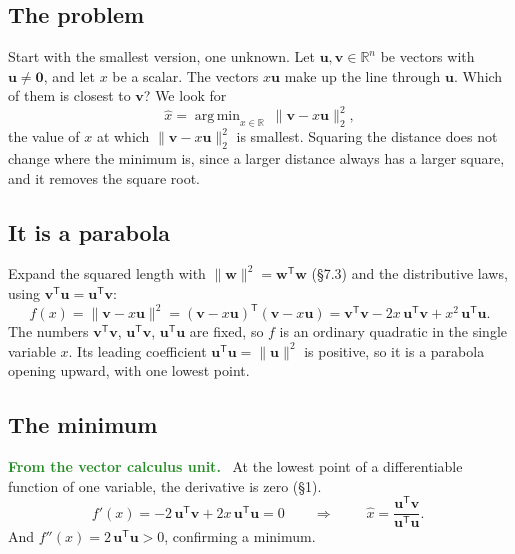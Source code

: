 \documentclass[11pt]{article}
\theoremstyle{plain}
\theoremstyle{definition}
\theoremstyle{remark}
\newcommand{\lookback}[1][the vector unit]{\par\smallskip\noindent
  \textbf{\sffamily\textcolor{ForestGreen}{From #1.}}\ \ignorespaces}
\newcommand{\R}{\mathbb{R}}
\newcommand{\vc}[1]{\mathbf{#1}}
\newcommand{\norm}[1]{\lVert #1\rVert}
\newcommand{\T}{^{\mathsf{T}}}
\DeclareMathOperator*{\argmin}{arg\,min}
\begin{document}
\subsection{The problem}
Start with the smallest version, one unknown. Let $\vc{u},\vc{v}\in\R^{n}$ be
vectors with $\vc{u}\neq\vc{0}$, and let $x$ be a scalar. The vectors $x\vc{u}$
make up the line through $\vc{u}$. Which of them is closest to $\vc{v}$? We look
for
\[
  \hat x=\argmin_{x\in\R}\ \norm{\vc{v}-x\vc{u}}_2^{2},
\]
the value of $x$ at which $\norm{\vc{v}-x\vc{u}}_2^{2}$ is smallest. Squaring
the distance does not change where the minimum is, since a larger distance always
has a larger square, and it removes the square root.

\subsection{It is a parabola}
Expand the squared length with $\norm{\vc{w}}^{2}=\vc{w}\T\vc{w}$ (\S7.3) and the
distributive laws, using $\vc{v}\T\vc{u}=\vc{u}\T\vc{v}$:
\[
  f(x)=\norm{\vc{v}-x\vc{u}}^{2}
  =(\vc{v}-x\vc{u})\T(\vc{v}-x\vc{u})
  =\vc{v}\T\vc{v}-2x\,\vc{u}\T\vc{v}+x^{2}\,\vc{u}\T\vc{u}.
\]
The numbers $\vc{v}\T\vc{v}$, $\vc{u}\T\vc{v}$, $\vc{u}\T\vc{u}$ are fixed, so $f$ is
an ordinary quadratic in the single variable $x$. Its leading coefficient
$\vc{u}\T\vc{u}=\norm{\vc{u}}^{2}$ is positive, so it is a parabola opening upward,
with one lowest point.

\subsection{The minimum}
\lookback[the vector calculus unit] At the lowest point of a differentiable
function of one variable, the derivative is zero (\S1).
\[
  f'(x)=-2\,\vc{u}\T\vc{v}+2x\,\vc{u}\T\vc{u}=0
  \qquad\Longrightarrow\qquad
  \boxed{\;\hat x=\frac{\vc{u}\T\vc{v}}{\vc{u}\T\vc{u}}.\;}
\]
And $f''(x)=2\,\vc{u}\T\vc{u}>0$, confirming a minimum.

\end{document}
